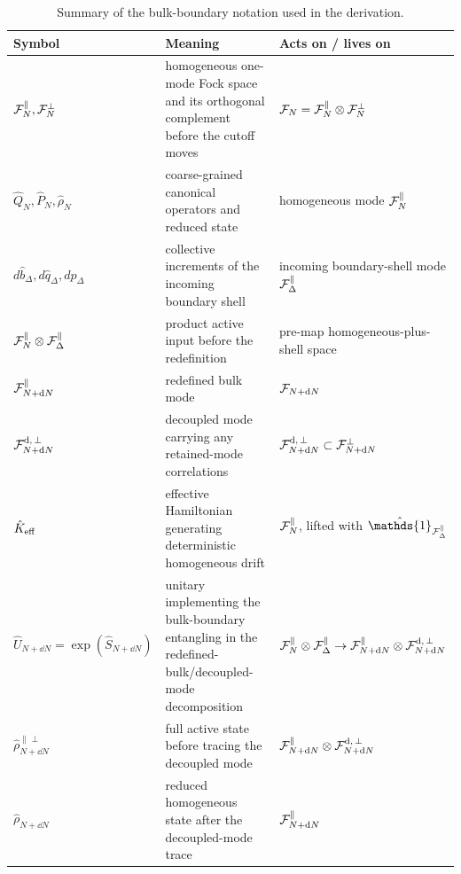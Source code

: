 \documentclass{article}
\def\cF{{\cal F}}
\newcommand{\openone}{\hat{\mathds{1}}}
\numberwithin{equation}{section}
\begin{document}
	\begin{table}[ht]
		\centering \small \renewcommand{\arraystretch}{1.25}
		\begin{tabularx}{\textwidth}{
				>{\raggedright\arraybackslash}p{} >{\raggedright\arraybackslash}X >{\raggedright\arraybackslash}p{}} \hline
			Symbol & Meaning & Acts on / lives on \\ \hline
			\(\cF_N^\parallel,\cF_N^\perp\) & homogeneous one-mode Fock space and its orthogonal complement before the cutoff moves & \(\cF_N=\cF_N^\parallel\otimes\cF_N^\perp\) \\ \hdashline
			\(\hat Q_N,\hat P_N,\hat\rho_N\) & coarse-grained canonical operators and reduced state & homogeneous mode \(\cF_N^\parallel\) \\ \hdashline
			\(d\hat b_\Delta,d\hat q_\Delta,d\hat p_\Delta\) & collective increments of the incoming boundary shell & incoming boundary-shell mode \(\cF_\Delta^\parallel\) \\ \hdashline
			\(\cF_N^\parallel\otimes\cF_\Delta^\parallel\) & product active input before the redefinition & pre-map homogeneous-plus-shell space \\ \hdashline
			\(\cF_{N+\dd N}^\parallel\) & redefined bulk mode & \(\cF_{N+\dd N}\) \\ \hdashline
			\(\cF^{\rm d,\,\perp}_{N+\dd N}\) & decoupled mode carrying any retained-mode correlations & \(\cF^{\rm d,\,\perp}_{N+\dd N}\subset\cF_{N+\dd N}^\perp\) \\ \hdashline
			\(\hat K_{\rm eff}\) & effective Hamiltonian generating deterministic homogeneous drift & \(\cF_N^\parallel\), lifted with \(\openone_{\cF_\Delta^\parallel}\) \\ \hdashline
			\(\hat U_{N+\dd N}=\exp(\hat S_{N+\dd N})\) & unitary implementing the bulk-boundary entangling in the redefined-bulk/decoupled-mode decomposition & \(\cF_N^\parallel\otimes\cF_\Delta^\parallel \to \cF_{N+\dd N}^\parallel\otimes\cF^{\rm d,\,\perp}_{N+\dd N}\) \\ \hdashline
			\(\hat\rho_{N+\dd N}^{\parallel\perp}\) & full active state before tracing the decoupled mode & \(\cF_{N+\dd N}^\parallel\otimes\cF^{\rm d,\,\perp}_{N+\dd N}\) \\ \hdashline
			\(\hat\rho_{N+\dd N}\) & reduced homogeneous state after the decoupled-mode trace & \(\cF_{N+\dd N}^\parallel\) \\ \hline
		\end{tabularx}
		\caption{\small Summary of the bulk-boundary notation used in the derivation.}
		\label{tab:bulk-boundary-notation}
	\end{table}
\end{document}
